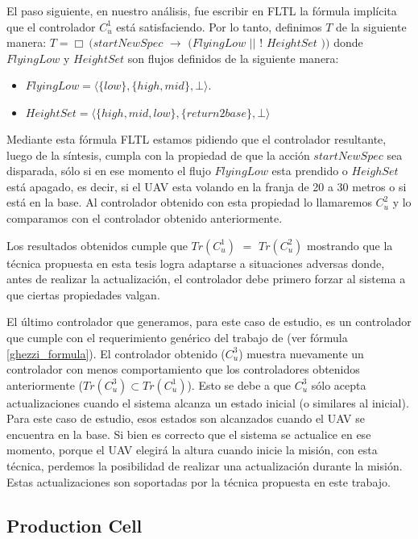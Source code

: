 El paso siguiente, en nuestro análisis, fue escribir en FLTL la fórmula implícita que el controlador $C_u^1$ está
satisfaciendo. Por lo tanto, definimos $T$ de la siguiente manera: $T = \Box\ (startNewSpec$
$\rightarrow$ $(FlyingLow$ $||$ $!$ $HeightSet$ $))$ donde $FlyingLow$ y $HeightSet$ son flujos definidos de la siguiente manera: 

\begin{itemize}
\itemsep-4mm
\item $FlyingLow = \langle \{low\},\{high,mid\},\bot\rangle$.
\item $HeightSet = \langle \{high,mid,low\},\{return2base\},\bot\rangle$
\end{itemize}

Mediante esta fórmula FLTL estamos pidiendo que el controlador resultante, luego de la síntesis, cumpla con la propiedad
de que la acción $startNewSpec$ sea disparada, sólo si en ese momento el flujo $FlyingLow$ esta prendido o $HeighSet$
está apagado, es decir, si el UAV esta volando en la franja de 20 a 30 metros o si está en la base. Al controlador
obtenido con esta propiedad lo llamaremos $C_u^2$ y lo comparamos con el controlador obtenido anteriormente.

Los resultados obtenidos cumple que $Tr(C_u^1)$ $=$ $Tr(C_u^2)$ mostrando que la técnica propuesta en esta tesis logra
adaptarse a situaciones adversas donde, antes de realizar la actualización, el controlador debe primero forzar al
sistema a que ciertas propiedades valgan.

El último controlador que generamos, para este caso de estudio, es un controlador que cumple con el requerimiento genérico
del trabajo de \cite{6224401} (ver fórmula \ref{ghezzi_formula}). El controlador obtenido ($C_u^3$) muestra nuevamente
un controlador con menos comportamiento que los controladores obtenidos anteriormente ($Tr(C_u^3) \subset Tr(C_u^1)$).
Esto se debe a que $C_u^3$ sólo acepta actualizaciones cuando el sistema alcanza un estado inicial (o similares al
inicial). Para este caso de estudio, esos estados son alcanzados cuando el UAV se encuentra en la base. Si bien es
correcto que el sistema se actualice en ese momento, porque el UAV elegirá la altura cuando inicie la misión, con esta
técnica, perdemos la posibilidad de realizar una actualización durante la misión. Estas actualizaciones son
soportadas por la técnica propuesta en este trabajo.

\subsection{Production Cell}

